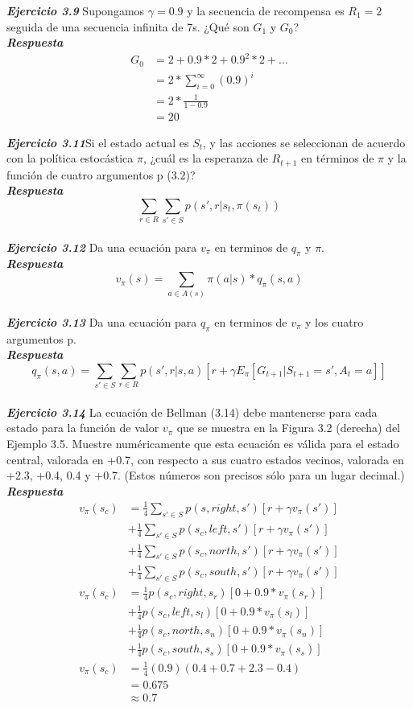 \documentclass[12pt,letterpaper,twoside]{article}
\begin{document}
\textbf{\textit{Ejercicio 3.9}} Supongamos $\gamma= 0.9$ y la secuencia de recompensa es $R_{1} = 2$ seguida de una secuencia infinita de 7s. ¿Qué son $G_1$ y $G_0$?\\
\textbf{\textit{Respuesta}}
\begin{align*}
G_0 &=2+0.9*2+0.9^2*2+ \dots \\
	&=2*\sum_{i=0}^\infty (0.9)^i \\
	&=2*\frac{1}{1-0.9}\\
	&=20
\end{align*}

\textbf{\textit{Ejercicio 3.11}}Si el estado actual es $S_t$, y las acciones se seleccionan de acuerdo con la política estocástica $\pi$, ¿cuál es la esperanza de $R_{t+1}$ en términos de $\pi$ y la función de cuatro argumentos p (3.2)?\\
\textbf{\textit{Respuesta}}
$$\sum_{r \in R}\sum_{s' \in S}p(s',r | s_t,\pi(s_t))$$\\

\textbf{\textit{Ejercicio 3.12}} Da una ecuación para $v_{\pi}$ en terminos de $q_{\pi}$ y $\pi$.\\
\textbf{\textit{Respuesta}}
$$v_\pi (s)=\sum_{a \in A(s)} \pi(a|s)*q_\pi(s,a) $$\\

\textbf{\textit{Ejercicio 3.13}} Da una ecuación para $q_{\pi}$ en terminos de $v_{\pi}$ y los cuatro argumentos p.\\
\textbf{\textit{Respuesta}}
$$ q_\pi(s,a)=\sum_{s' \in S}\sum_{r \in R}p(s',r | s,a)[r+\gamma E_\pi[G_{t+1}|S_{t+1}=s',A_t=a]]$$\\


\textbf{\textit{Ejercicio 3.14}} La ecuación de Bellman (3.14) debe mantenerse para cada estado para la función de valor $v_{\pi}$ que se muestra en la Figura 3.2 (derecha) del Ejemplo 3.5. Muestre numéricamente que esta ecuación es válida para el estado central, valorada en +0.7, con respecto a sus cuatro estados vecinos, valorada en +2.3, +0.4, 0.4 y +0.7. (Estos números son precisos sólo para un lugar decimal.)\\
\textbf{\textit{Respuesta}}
\begin{align*}
v_\pi(s_c) &= \frac{1}{4} \sum_{s' \in S} p(s,right,s')[r+\gamma v_\pi(s')] \\
	&+ \frac{1}{4} \sum_{s' \in S} p(s_c,left,s')[r+\gamma v_\pi(s')]\\
	&+ \frac{1}{4} \sum_{s' \in S} p(s_c,north,s')[r+\gamma v_\pi(s')]\\
	&+ \frac{1}{4} \sum_{s' \in S} p(s_c,south,s')[r+\gamma v_\pi(s')]\\
v_\pi(s_c) &= \frac{1}{4} p(s_c,right,s_r)[0+0.9* v_\pi(s_r)] \\
	&+ \frac{1}{4} p(s_c,left,s_l)[0+0.9*v_\pi(s_l)]\\
	&+ \frac{1}{4} p(s_c,north,s_n)[0+0.9*v_\pi(s_n)]\\
	&+ \frac{1}{4} p(s_c,south,s_s)[0+0.9*v_\pi(s_s)]\\
v_\pi(s_c) &= \frac{1}{4}(0.9)(0.4+0.7+2.3-0.4)\\
	&= 0.675\\
	&\approx 0.7
\end{align*}
\\
\end{document}
